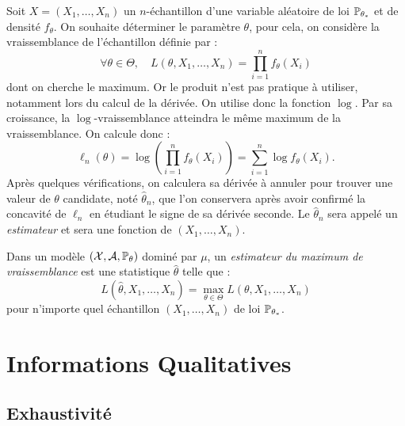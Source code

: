 \begin{proposition}
    Soit $X = (X_1, \dots, X_n)$ un $n$-échantillon d'une variable aléatoire de loi $ \mathbb{P}_{\theta_*}$ et 
    de densité $ f_\theta$. 
    On souhaite déterminer le paramètre $ \theta$, pour cela, on considère la vraissemblance de l'échantillon 
    définie par : 
        $$ \forall \theta \in \Theta, \quad L( \theta, X_1, \dots, X_n) = \prod_{i=1}^{n} f_\theta(X_i)$$
    dont on cherche le maximum. Or le produit n'est pas pratique à utiliser, notamment lors du calcul de la 
    dérivée. On utilise donc la fonction $ \log$. Par sa croissance, la $\log$-vraissemblance atteindra le 
    même maximum de la vraissemblance. On calcule donc : 
        $$ 
            \ell_n(\theta) = \log \left( \prod_{i=1}^{n} f_\theta(X_i) \right) 
            = \sum_{i=1}^{n} \log f_\theta(X_i).
        $$ 
    Après quelques vérifications, on calculera sa dérivée à annuler pour trouver une valeur de 
    $ \theta$ candidate, noté $ \hat{\theta}_n$, que l'on conservera après avoir confirmé la concavité de $ \ell_n$ en étudiant 
    le signe de sa dérivée seconde. 
    Le $ \hat{\theta}_n$ sera appelé un \emph{estimateur} et sera une fonction de $(X_1, \dots, X_n)$. 
\end{proposition}

\begin{definition}[Estimateur]
    Dans un modèle $( \mathcal{X}, \mathcal{A}, \mathbb{P}_\theta)$ dominé par $ \mu$, un \emph{estimateur du maximum de 
    vraissemblance} est une statistique $ \hat{\theta}$ telle que : 
        \begin{equation}
            L( \hat{\theta}, X_1, \dots, X_n) = \max_{\theta \in \Theta} L(\theta, X_1, \dots, X_n)
        \end{equation} 
    pour n'importe quel échantillon $(X_1, \dots, X_n)$ de loi $ \mathbb{P}_{\theta_*}$. 
\end{definition}


\section{Informations Qualitatives}

\subsection{Exhaustivité}


